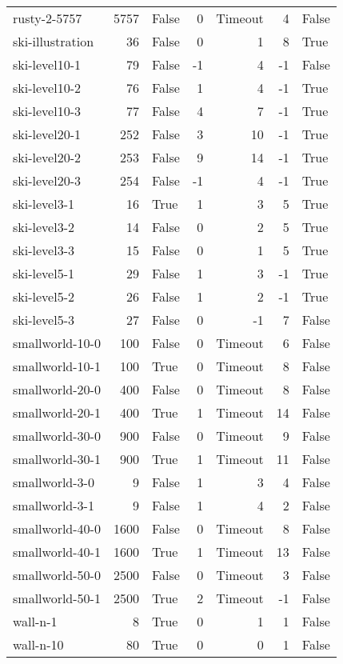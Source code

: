 \begin{longtable}{lrlrrrl}
rusty-2-5757 & 5757 & False & 0 & Timeout & 4 & False \\
ski-illustration & 36 & False & 0 & 1 & 8 & True \\
ski-level10-1 & 79 & False & -1 & 4 & -1 & False \\
ski-level10-2 & 76 & False & 1 & 4 & -1 & True \\
ski-level10-3 & 77 & False & 4 & 7 & -1 & True \\
ski-level20-1 & 252 & False & 3 & 10 & -1 & True \\
ski-level20-2 & 253 & False & 9 & 14 & -1 & True \\
ski-level20-3 & 254 & False & -1 & 4 & -1 & True \\
ski-level3-1 & 16 & True & 1 & 3 & 5 & True \\
ski-level3-2 & 14 & False & 0 & 2 & 5 & True \\
ski-level3-3 & 15 & False & 0 & 1 & 5 & True \\
ski-level5-1 & 29 & False & 1 & 3 & -1 & True \\
ski-level5-2 & 26 & False & 1 & 2 & -1 & True \\
ski-level5-3 & 27 & False & 0 & -1 & 7 & False \\
smallworld-10-0 & 100 & False & 0 & Timeout & 6 & False \\
smallworld-10-1 & 100 & True & 0 & Timeout & 8 & False \\
smallworld-20-0 & 400 & False & 0 & Timeout & 8 & False \\
smallworld-20-1 & 400 & True & 1 & Timeout & 14 & False \\
smallworld-30-0 & 900 & False & 0 & Timeout & 9 & False \\
smallworld-30-1 & 900 & True & 1 & Timeout & 11 & False \\
smallworld-3-0 & 9 & False & 1 & 3 & 4 & False \\
smallworld-3-1 & 9 & False & 1 & 4 & 2 & False \\
smallworld-40-0 & 1600 & False & 0 & Timeout & 8 & False \\
smallworld-40-1 & 1600 & True & 1 & Timeout & 13 & False \\
smallworld-50-0 & 2500 & False & 0 & Timeout & 3 & False \\
smallworld-50-1 & 2500 & True & 2 & Timeout & -1 & False \\
wall-n-1 & 8 & True & 0 & 1 & 1 & False \\
wall-n-10 & 80 & True & 0 & 0 & 1 & False \\

\end{longtable}
